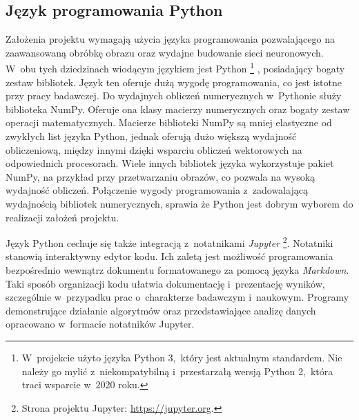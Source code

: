 \subsection{Język programowania Python}
Założenia projektu wymagają użycia języka programowania pozwalającego na
zaawansowaną obróbkę obrazu oraz wydajne budowanie sieci neuronowych.
W~obu tych dziedzinach wiodącym językiem jest Python%
\footnote{%
    W~projekcie użyto języka Python 3,~który jest aktualnym standardem.
    Nie należy go mylić z~niekompatybilną i~przestarzałą wersją Python 2,~która
    traci wsparcie w~2020 roku.
}%
, posiadający bogaty zestaw bibliotek.
Język ten oferuje dużą wygodę programowania, co jest istotne przy pracy
badawczej.
Do wydajnych obliczeń numerycznych w~Pythonie służy biblioteka NumPy.
Oferuje ona klasy macierzy numerycznych oraz bogaty zestaw operacji
matematycznych.
Macierze biblioteki NumPy są mniej elastyczne od zwykłych list języka Python,
jednak oferują dużo większą wydajność obliczeniową, między innymi dzięki
wsparciu obliczeń wektorowych na odpowiednich procesorach.
Wiele innych bibliotek języka wykorzystuje pakiet NumPy, na przykład przy
przetwarzaniu obrazów, co pozwala na wysoką wydajność obliczeń.
Połączenie wygody programowania z~zadowalającą wydajnością bibliotek
numerycznych, sprawia że Python jest dobrym wyborem do realizacji założeń
projektu.

Język Python cechuje się także integracją z~notatnikami \emph{Jupyter}%
\footnote{Strona projektu Jupyter: \url{https://jupyter.org}.
}.
Notatniki stanowią interaktywny edytor kodu.
Ich zaletą jest możliwość programowania bezpośrednio wewnątrz dokumentu
formatowanego za pomocą języka \emph{Markdown}.
Taki sposób organizacji kodu ułatwia dokumentację i~prezentację wyników,
szczególnie w~przypadku prac o~charakterze badawczym i~naukowym.
Programy demonstrujące działanie algorytmów oraz przedstawiające analizę danych
opracowano w~formacie notatników Jupyter.

